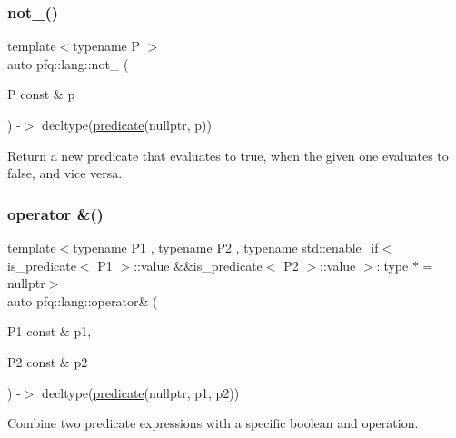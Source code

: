 \mbox{\label{namespacepfq_1_1lang_aad91ae49c0ddea5a9219f679e8de212a}} 
\subsubsection{\texorpdfstring{not\+\_\+()}{not\_()}}
{\footnotesize\ttfamily template$<$typename P $>$ \\
auto pfq\+::lang\+::not\+\_\+ (\begin{DoxyParamCaption}\item[{P const \&}]{p }\end{DoxyParamCaption}) -\/$>$ decltype(\hyperlink{namespacepfq_1_1lang_aca9adafc436b7f851621b979fa1aaf88}{predicate}(nullptr, p))
    \hspace{0.3cm}{\ttfamily [inline]}}



Return a new predicate that evaluates to true, when the given one evaluates to false, and vice versa. 

\mbox{\label{namespacepfq_1_1lang_a0697233877c06151b1ea7247ed24a9cb}} 
\subsubsection{\texorpdfstring{operator \&()}{operator \&()}}
{\footnotesize\ttfamily template$<$typename P1 , typename P2 , typename std\+::enable\+\_\+if$<$ is\+\_\+predicate$<$ P1 $>$\+::value \&\&is\+\_\+predicate$<$ P2 $>$\+::value $>$\+::type $\ast$  = nullptr$>$ \\
auto pfq\+::lang\+::operator\& (\begin{DoxyParamCaption}\item[{P1 const \&}]{p1,  }\item[{P2 const \&}]{p2 }\end{DoxyParamCaption}) -\/$>$ decltype(\hyperlink{namespacepfq_1_1lang_aca9adafc436b7f851621b979fa1aaf88}{predicate}(nullptr, p1, p2))
    \hspace{0.3cm}{\ttfamily [inline]}}



Combine two predicate expressions with a specific boolean \textquotesingle{}and\textquotesingle{} operation. 


